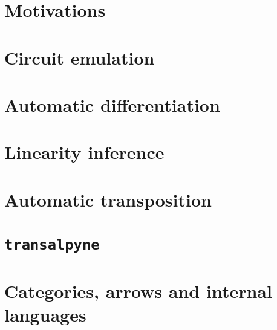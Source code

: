 \documentclass[10pt]{beamer}
\newcommand{\tALpy}{\texttt{transalpyne}}
\begin{document}

\section{Motivations}




\section{Circuit emulation}


\section{Automatic differentiation}


\section{Linearity inference}


\section{Automatic transposition}


\section{\tALpy}


\section{Categories, arrows and internal languages }


\end{document}
